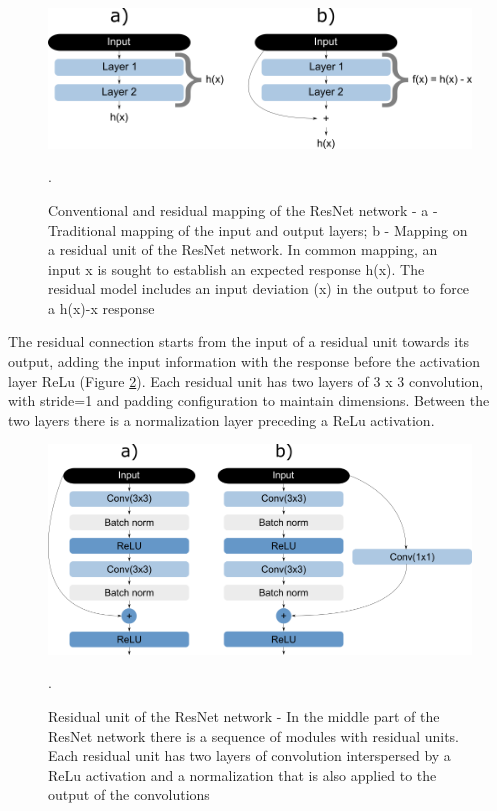 \begin{figure}
    \centering
    \includegraphics[scale=0.4]{"Part 3 - Learning Systems/Supervised Learning/Deep Learning/images/figure136.png"}
    \caption{Conventional and residual mapping of the ResNet network - a - Traditional mapping of the input and output layers; b - Mapping on a residual unit of the ResNet network. In common mapping, an input x is sought to establish an expected response h(x). The residual model includes an input deviation (x) in the output to force a h(x)-x response \cite{geron2019}}.
    \label{fig:figure136}
\end{figure}

The residual connection starts from the input of a residual unit towards its output, adding the input information with the response before the activation layer ReLu (Figure  \ref{fig:figure137}). Each residual unit has two layers of 3 x 3 convolution, with stride=1 and padding configuration to maintain dimensions. Between the two layers there is a normalization layer preceding a ReLu activation.

\begin{figure}
    \centering
    \includegraphics[scale=0.4]{"Part 3 - Learning Systems/Supervised Learning/Deep Learning/images/figure137.png"}
    \caption{Residual unit of the ResNet network - In the middle part of the ResNet network there is a sequence of modules with residual units. Each residual unit has two layers of convolution interspersed by a ReLu activation and a normalization that is also applied to the output of the convolutions \cite{geron2019}}.
    \label{fig:figure137}
\end{figure}

